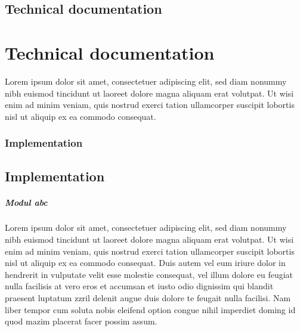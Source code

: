 \newpage
\thispagestyle{plain}
{
	\section{Technical documentation}
}
{
	\chapter{Technical documentation}
}
 \label{technical_documentation}
Lorem ipsum dolor sit amet, consectetuer adipiscing elit, sed diam nonummy nibh euismod tincidunt ut laoreet dolore magna aliquam erat volutpat. Ut wisi enim ad minim veniam, quis nostrud exerci tation ullamcorper suscipit lobortis nisl ut aliquip ex ea commodo consequat.
{
	\subsection{Implementation}
}
{
	\section{Implementation}
}
\paragraph{Modul abc}
Lorem ipsum dolor sit amet, consectetuer adipiscing elit, sed diam nonummy nibh euismod tincidunt ut laoreet dolore magna aliquam erat volutpat. Ut wisi enim ad minim veniam, quis nostrud exerci tation ullamcorper suscipit lobortis nisl ut aliquip ex ea commodo consequat. Duis autem vel eum iriure dolor in hendrerit in vulputate velit esse molestie consequat, vel illum dolore eu feugiat nulla facilisis at vero eros et accumsan et iusto odio dignissim qui blandit praesent luptatum zzril delenit augue duis dolore te feugait nulla facilisi. Nam liber tempor cum soluta nobis eleifend option congue nihil imperdiet doming id quod mazim placerat facer possim assum.
